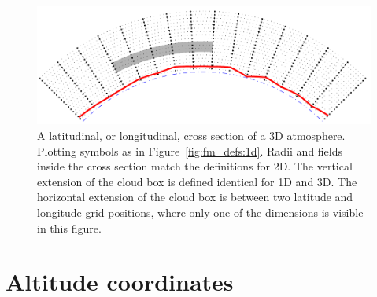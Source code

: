 \begin{figure}[!p]
 \begin{center}
  \includegraphics*[width=0.98\hsize]{atm_dim_3dcross}
  \caption{A latitudinal, or longitudinal, cross section of a 3D atmosphere. 
    Plotting symbols as in Figure~\ref{fig:fm_defs:1d}. Radii and
    fields inside the cross section match the definitions for 2D.
    The vertical extension
    of the cloud box is defined identical for 1D and 3D. The horizontal 
    extension of the cloud box is between two latitude and longitude grid
    positions, where only one of the dimensions is visible in this figure.}
  \label{fig:fm_defs:3dcross}
 \end{center}
\end{figure}



\section{Altitude coordinates}
\label{sec:fm_defs:altitudes}

